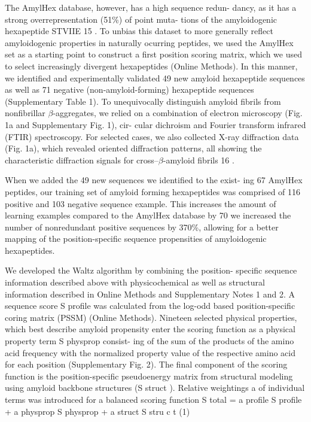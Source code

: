 The AmylHex database, however, has a high sequence redun-
dancy, as it has a strong overrepresentation (51\%) of point muta-
tions of the amyloidogenic hexapeptide STVIIE 15 . To unbias
this dataset to more generally reflect amyloidogenic 
properties in naturally ocurring peptides, we used the AmylHex set as a
starting point to construct a first position scoring matrix, which
we used to select increasingly divergent hexapeptides (Online
Methods). In this manner, we identified and experimentally
validated 49 new amyloid hexapeptide sequences as well as
71 negative (non-amyloid-forming) hexapeptide sequences
(Supplementary Table 1).
To unequivocally distinguish amyloid
fibrils from nonfibrillar $\beta$-aggregates, we relied on a combination
of electron microscopy (Fig. 1a and Supplementary Fig. 1), cir-
cular dichroism and Fourier transform infrared (FTIR) spectroscopy. 
For selected cases, we also collected X-ray diffraction data
(Fig. 1a), which revealed oriented diffraction patterns, all showing
the characteristic diffraction signals for cross–$\beta$-amyloid fibrils 16 .

When we added the 49 new sequences we identified to the exist-
ing 67 AmylHex peptides, our training set of amyloid forming hexapeptides was comprised of 116 positive and 103 negative
sequence example. 
This increases the amount of learning examples
compared to the AmylHex database by 70%
we increased the number of nonredundant positive sequences
by 370\%, allowing for a better mapping of the position-specific
sequence propensities of amyloidogenic hexapeptides.



We developed the Waltz algorithm by combining the position-
specific sequence information described above with physicochemical as well as structural information described in Online
Methods and Supplementary Notes 1 and 2. A sequence score
S profile was calculated from the log-odd based position-specific
coring matrix (PSSM) (Online Methods). Nineteen selected
physical properties, which best describe amyloid propensity enter
the scoring function as a physical property term S physprop consist-
ing of the sum of the products of the amino acid frequency with
the normalized property value of the respective amino acid for
each position (Supplementary Fig. 2). The final component of
the scoring function is the position-specific pseudoenergy matrix
from structural modeling using amyloid backbone structures
(S struct ). Relative weightings a of individual terms was introduced
for a balanced scoring function
S total = a profile S profile + a physprop S physprop + a struct S stru c t (1)

